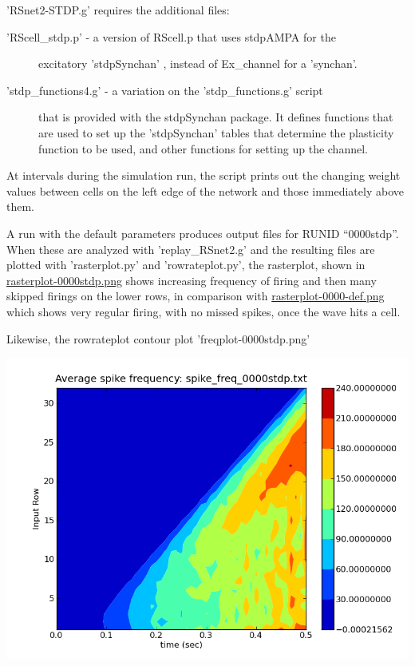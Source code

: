 \documentclass[10pt,a4paper,english]{article}
\begin{document}
'RSnet2-STDP.g' requires the additional files:
\begin{description}
\item[{'RScell{\_}stdp.p' - a version of RScell.p that uses stdpAMPA for the}] \leavevmode 
excitatory 'stdpSynchan' , instead of Ex{\_}channel for a 'synchan'.

\item[{'stdp{\_}functions4.g' - a variation on the 'stdp{\_}functions.g' script}] \leavevmode 
that is provided with the stdpSynchan package.  It defines functions
that are used to set up the 'stdpSynchan' tables that determine
the plasticity function to be used, and other functions for setting
up the channel.

\end{description}

At intervals during the simulation run, the script prints out the
changing weight values between cells on the left edge of the network
and those immediately above them.

A run with the default parameters produces output files for RUNID
``0000stdp''.  When these are analyzed with 'replay{\_}RSnet2.g' and the
resulting files are plotted with 'rasterplot.py' and 'rowrateplot.py',
the rasterplot, shown in \href{figures/rasterplot-0000stdp.png}{rasterplot-0000stdp.png}
shows increasing frequency of firing and then many skipped firings
on the lower rows, in comparison with \href{figures/rasterplot-0000-def.png}{rasterplot-0000-def.png}
which shows very regular firing, with no missed spikes, once the wave
hits a cell.

Likewise, the rowrateplot contour plot 'freqplot-0000stdp.png'

\includegraphics{figures/freqplot-0000stdp.png}
\end{document}
